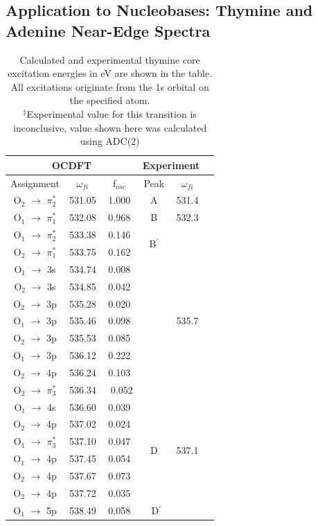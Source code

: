 \documentclass[11.5pt]{article}
\begin{document}
\subsection{Application to Nucleobases: Thymine and Adenine Near-Edge Spectra}

\begin{table}
\centering
    \begin{tabular}{c@{\hskip 0.22in}c@{\hskip 0.22in}c@{\hskip 0.52in}c@{\hskip 0.22in}c@{\hskip 0.22in}c}
    \hline
    \hline
  \multicolumn{3}{c}{OCDFT} &\multicolumn{2}{c}{Experiment} \\
  \hline
  Assignment & $\omega_{fi}$ & f$_{osc}$ & Peak &  $\omega_{fi}$   \\
  \hline
   O$_2$ $\rightarrow$ $\pi_2^*$ & 531.05 & 1.000 &  A & 531.4
   \vspace{2mm}\\
   O$_1$ $\rightarrow$ $\pi_1^*$ & 532.08 & 0.968 &  B & 532.3 
   \vspace{2mm}\\
   O$_1$ $\rightarrow$ $\pi_2^*$ & 533.38 & 0.146 & \multirow{2}{*}{ B$^{\prime}$} \\
   O$_2$ $\rightarrow$ $\pi_1^*$ & 533.75 & 0.162 &  \multirow{9}{*}{C} & \multirow{9}{*}{535.7}
   \vspace{2mm}\\
   O$_1$ $\rightarrow$ 3s & 534.74 & 0.008 \\
   O$_2$ $\rightarrow$ 3s & 534.85 & 0.042 \\
   O$_2$ $\rightarrow$ 3p & 535.28 & 0.020\\
   O$_1$ $\rightarrow$ 3p & 535.46 & 0.098\\
   O$_2$ $\rightarrow$ 3p & 535.53 & 0.085\\
   O$_1$ $\rightarrow$ 3p & 536.12 & 0.222\\
   O$_2$ $\rightarrow$ 4p & 536.24 & 0.103\\
   O$_2$ $\rightarrow$ $\pi_3^*$ & 536.34 & \ 0.052
   \vspace{2mm}\\
   O$_1$ $\rightarrow$ 4s & 536.60 & 0.039 & \multirow{6}{*}{D} & \multirow{6}{*}{537.1}\\
   O$_2$ $\rightarrow$ 4p & 537.02 & 0.024\\
   O$_1$ $\rightarrow$ $\pi_3^*$ & 537.10 & 0.047\\
   O$_1$ $\rightarrow$ 4p & 537.45 & 0.054\\
   O$_2$ $\rightarrow$ 4p & 537.67 & 0.073\\
   O$_2$ $\rightarrow$ 4p & 537.72 & 0.035
   \vspace{2mm}\\
   O$_1$ $\rightarrow$ 5p & 538.49 & 0.058 & \ D$^{\prime}$\\
   \hline
  \end{tabular}
      \caption{Calculated and experimental thymine core excitation energies in eV are shown in the table. All excitations originate from the 1s orbital on the specified atom. \\
  $^{\ddagger}$Experimental value for this transition is inconclusive, value shown here was calculated using ADC(2)}
  \label{figure:MOs}
  \end{table}
\end{document}
